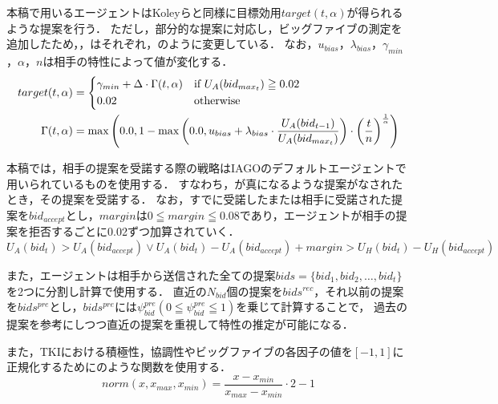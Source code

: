 本稿で用いるエージェントはKoleyらと同様に目標効用$target(t,\alpha)$が得られるような提案を行う．
ただし，部分的な提案に対応し，ビッグファイブの測定を追加したため，，はそれぞれ，のように変更している．
なお，$u_{bias}$，$\lambda_{bias}$，$\gamma_{min}$，$\alpha$，$n$は相手の特性によって値が変化する．
\begin{align}
    target(t,\alpha) &= 
    \begin{cases*}
        \gamma_{min} + \Delta \cdot \Gamma(t,\alpha) & if $U_A(bid_{max_t}) \geqq 0.02$  \\
        0.02 & otherwise 
    \end{cases*} \label{eq:newtarget}\\
    \Gamma(t,\alpha) &= \max \left( 0.0, 1 - \max \left( 0.0, u_{bias} + \lambda_{bias} \cdot \frac{U_A(bid_{t - 1})}{U_A(bid_{max_t})} \right) \cdot \left( \frac{t}{n} \right)^{\frac{1}{\alpha}} \right) \label{eq:newgamma}
\end{align}

本稿では，相手の提案を受諾する際の戦略はIAGOのデフォルトエージェントで用いられているものを使用する．
すなわち，が真になるような提案がなされたとき，その提案を受諾する．
なお，すでに受諾したまたは相手に受諾された提案を$bid_{accept}$とし，$margin$は$0 \leqq margin \leqq 0.08$であり，エージェントが相手の提案を拒否するごとに0.02ずつ加算されていく．
\begin{equation}
    U_A(bid_t) > U_A(bid_{accept}) \vee  U_A(bid_t) - U_A(bid_{accept}) + margin > U_H(bid_t) - U_H(bid_{accept}) 
    \label{eq:acceptance}
\end{equation}

また，エージェントは相手から送信された全ての提案$bids = \{ bid_1, bid_2, \ldots , bid_t \}$を2つに分割し計算で使用する．
直近の$N_{\mathit{bid}}$個の提案を$bids^{rec}$，それ以前の提案を$bids^{pre}$とし，$bids^{pre}$には$\psi_{\mathit{bid}}^{pre}(0 \leqq \psi_{\mathit{bid}}^{pre} \leqq 1)$を乗じて計算することで，
過去の提案を参考にしつつ直近の提案を重視して特性の推定が可能になる．

また，TKIにおける積極性，協調性やビッグファイブの各因子の値を$[-1, 1]$に正規化するためにのような関数を使用する．
\begin{equation}
    norm(x, x_{max}, x_{min}) = \frac{x - x_{min}}{x_{max} - x_{min}} \cdot 2 - 1
    \label{eq:normarize}
\end{equation}

